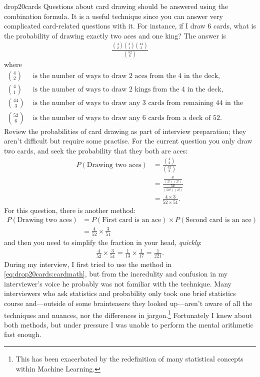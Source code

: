 \begin{answer}{drop20cards}
Questions about card drawing should be answered using the combination formula.
It is a useful technique since you can answer very complicated card-related questions with it.
For instance, if I draw 6 cards, what is the probability of drawing exactly two aces and one king?
The answer is
\begin{align}
 \frac{\binom{4}{2} \binom{4}{1} \binom{44}{3} }{\binom{52}{6} }
\end{align}
where
\begin{align*}
\binom{4}{2}&
  \text{ is the number of ways to draw 2 aces from the 4 in the deck,} \\
\binom{4}{1}&
  \text{ is the number of ways to draw 2 kings from the 4 in the deck,} \\
\binom{44}{3}&
  \text{ is the number of ways to draw  any 3 cards from remaining 44 in the deck,} \\
\binom{52}{6}&
  \text{ is the number of ways to draw any 6 cards from a deck of 52.}
\end{align*}
Review the probabilities of card drawing as part of interview preparation; they aren't difficult but require some practise.
For the current question you only draw two cards, and seek the probability that they both are aces:
\begin{align}
 \label{eq:drop20cards:cardmath}
P(\text{Drawing two aces})
&= \frac{\binom{4}{2} }{\binom{52}{2} } \\
&= \frac{ \frac{4!}{(2!)(2!)}  }{ \frac{52!}{ (50!) (2!) } } \nonumber \\
&= \frac{ 4 \times 3  }{ 52 \times 51 } \nonumber
\text{.}
\end{align}
For this question, there is another method:
\begin{align*}
P(\text{Drawing two aces})
&=
P(\text{First card is an ace})
\times
P(\text{Second card is an ace})
\\
&=
\frac{4}{52}
\times
\frac{3}{51}
\end{align*}
and then you need to simplify the fraction in your head, \emph{quickly}:
\begin{align*}
\frac{4}{52}
\times
\frac{3}{51}
=
\frac{1}{13}
\times
\frac{1}{17}
=
\frac{1}{221}
\text{.}
\end{align*}
During my interview, I first tried to use the method in
\eqref{eq:drop20cards:cardmath},
but from the incredulity and confusion in my interviewer's voice he probably was not familiar with the technique.
Many interviewers who ask statistics and probability only took one brief statistics course and---outside of some brainteasers they looked up---aren't aware of all the techniques and nuances, nor the differences in jargon.\footnote{This has been exacerbated by the redefinition of many statistical concepts within Machine Learning.}
Fortunately I knew about both methods, but under pressure I was unable to perform the mental arithmetic fast enough.
\end{answer}
